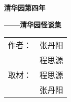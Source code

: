 \documentclass[UTF-8,openright]{ctexbook}
\begin{document}

\begin{titlepage}
	\centering
	\linespread{1.2}
	\vspace*{1cm}
	{ \textbf{清华园第四年}\par}
	\vspace{0.5cm}
	{ \textbf{——清华园怪谈集}\par}
	\vfill
	\begin{table}[!hb]
		\LARGE
		\centering
		\begin{tabular}{rc}
			作者： &	张丹阳 \\
			&			程思源 \\
			取材： &	程思源 \\
			&			张丹阳
		\end{tabular}
		\vspace{1cm}
	\end{table}
\end{titlepage}

\pagestyle{headings}



\tableofcontents
\newpage







\end{document}
